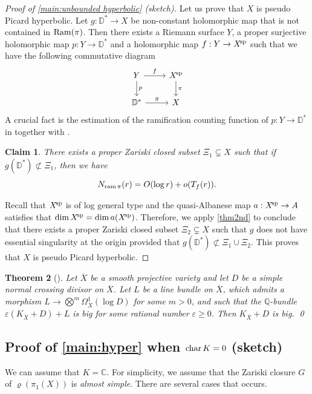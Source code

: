 \documentclass[english]{amsproc}
\theoremstyle{plain}
\newtheorem{thm}{Theorem}[section]
\newtheorem{claim}[thm]{Claim}
\theoremstyle{definition}
\theoremstyle{remark}
\theoremstyle{plain}
\numberwithin{equation}{thm} %
\newcommand{\bC}{\mathbb{C}}
\newcommand{\bD}{\mathbb{D}}
\newcommand{\xsp}{X^{\! \rm sp}}
\begin{document}
\begin{proof}[Proof of \cref{main:unbounded hyperbolic} (sketch)]
		\medspace
		
		Let us prove that $X$ is pseudo Picard hyperbolic. 
		Let $g:\bD^*\to X$ be non-constant holomorphic map that is not contained in ${\rm Ram}(\pi)$. Then there exists a Riemann surface $Y$, a proper surjective holomorphic map $p:Y\to\bD^*$ and a holomorphic map $f:Y\to \xsp$ such that we have the following commutative diagram
		\begin{equation*}
			\begin{tikzcd}
				Y\arrow[r, "f"] \arrow[d, "p"]& \xsp\arrow[d, "\pi"]\\
				\bD^*\arrow[r, "g"] &X
			\end{tikzcd}
		\end{equation*}
		A crucial fact is the estimation of  the ramification counting function of $p:Y\to \bD^*$ in \cite[Lemma 4.11]{CDY22} together with \cite[Lemma 11.2]{CDY25}.
		\begin{claim}\label{claim:small ram}
			There exists a proper Zariski closed subset $\Xi_1\subsetneq X$ such that if  $g(\bD^*)\not\subset \Xi_1$, then we have
			$$
			N_{{\rm ram}\,  \pi}(r)=O(\log r)+o(T_f(r)). 
			$$
		\end{claim}
		Recall that $\xsp$ is of log general type and the quasi-Albanese map $a:\xsp\to A$ satisfies that $\dim \xsp=\dim a(\xsp)$. Therefore, we apply \cref{thm2nd} to conclude that there exists a  proper Zariski closed subset $\Xi_2\subsetneq X$  such that 
		$g$ does not have essential singularity at the origin provided that $g(\bD^*)\not\subset \Xi_1\cup\Xi_2$.  This proves that $X$ is pseudo Picard hyperbolic. 
	\end{proof}  
	
	\begin{thm}[{\cite[Corollary 8.7]{CP19}}]\label{thm:CP}
		Let $\overline{X}$ be a smooth projective variety and let $D$ be a simple normal crossing divisor on $\overline{X}$. Let $L$ be a line bundle on $\overline{X}$, which admits a morphism $L \rightarrow  \bigotimes^m \Omega^1_{\overline{X}}(\log D)$ for some $m>0$, and such that the $\mathbb{Q}$-bundle $\varepsilon\left(K_{\overline{X}}+D\right)+L$ is big for some rational number $\varepsilon \geq 0$. Then $K_{\overline{X}}+D$ is big. \qed
	\end{thm}
	
	\subsection{Proof of \cref{main:hyper} when ${\rm char}\, K=0$ (sketch)} 
	We can assume that $K=\bC$.  For simplicity, we assume that the Zariski closure $G$ of $\varrho(\pi_1(X))$  is \emph{almost simple}. There are several cases that occurs. 
	
\end{document}
